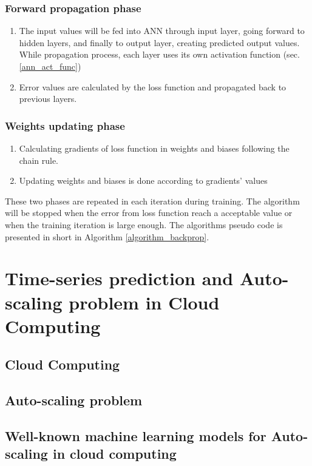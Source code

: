 \documentclass[a4paper,13pt,2p]{report}
\begin{document}
\subsubsection{Forward propagation phase}
\begin{enumerate}
\item The input values will be fed into ANN through input layer, going forward to hidden layers, and finally to output layer, creating predicted output values. While propagation process, each layer uses its own activation function (sec. \ref{ann_act_func})
\item Error values are calculated by the loss function and propagated back to previous layers.
\end{enumerate}
\subsubsection{Weights updating phase}

\begin{enumerate}
\item Calculating gradients of loss function in weights and biases following the chain rule.
\item Updating weights and biases is done according to gradients' values 
\end{enumerate}

These two phases are repeated in each iteration during training. The algorithm will be stopped when the error from loss function reach a acceptable value or when the training iteration is large enough. The algorithm\textquotesingle s pseudo code is presented in short in Algorithm \ref{algorithm_backprop}.

\section{Time-series prediction and Auto-scaling problem in Cloud Computing}
\label{sec:application}

\subsection{Cloud Computing}
\label{cloud}

\subsection{Auto-scaling problem}
\label{auto_scale}

\subsection{Well-known machine learning models for Auto-scaling in cloud computing}
\label{wl_known_models}
\end{document}
